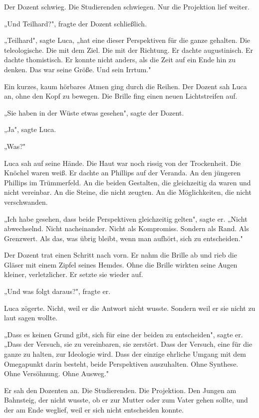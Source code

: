\documentclass[
  ngerman,
]{article}
\begin{document}
Der Dozent schwieg. Die Studierenden schwiegen. Nur die Projektion lief
weiter.

„Und Teilhard?", fragte der Dozent schließlich.

„Teilhard", sagte Luca, „hat eine dieser Perspektiven für die ganze
gehalten. Die teleologische. Die mit dem Ziel. Die mit der Richtung. Er
dachte augustinisch. Er dachte thomistisch. Er konnte nicht anders, als
die Zeit auf ein Ende hin zu denken. Das war seine Größe. Und sein
Irrtum."

Ein kurzes, kaum hörbares Atmen ging durch die Reihen. Der Dozent sah
Luca an, ohne den Kopf zu bewegen. Die Brille fing einen neuen
Lichtstreifen auf.

„Sie haben in der Wüste etwas gesehen", sagte der Dozent.

„Ja", sagte Luca.

„Was?"

Luca sah auf seine Hände. Die Haut war noch rissig von der Trockenheit.
Die Knöchel waren weiß. Er dachte an Phillips auf der Veranda. An den
jüngeren Phillips im Trümmerfeld. An die beiden Gestalten, die
gleichzeitig da waren und nicht vereinbar. An die Steine, die nicht
zeugten. An die Möglichkeiten, die nicht verschwanden.

„Ich habe gesehen, dass beide Perspektiven gleichzeitig gelten", sagte
er. „Nicht abwechselnd. Nicht nacheinander. Nicht als Kompromiss.
Sondern als Rand. Als Grenzwert. Als das, was übrig bleibt, wenn man
aufhört, sich zu entscheiden."

Der Dozent trat einen Schritt nach vorn. Er nahm die Brille ab und rieb
die Gläser mit einem Zipfel seines Hemdes. Ohne die Brille wirkten seine
Augen kleiner, verletzlicher. Er setzte sie wieder auf.

„Und was folgt daraus?", fragte er.

Luca zögerte. Nicht, weil er die Antwort nicht wusste. Sondern weil er
sie nicht zu laut sagen wollte.

„Dass es keinen Grund gibt, sich für eine der beiden zu entscheiden",
sagte er. „Dass der Versuch, sie zu vereinbaren, sie zerstört. Dass der
Versuch, eine für die ganze zu halten, zur Ideologie wird. Dass der
einzige ehrliche Umgang mit dem Omegapunkt darin besteht, beide
Perspektiven auszuhalten. Ohne Synthese. Ohne Versöhnung. Ohne Ausweg."

Er sah den Dozenten an. Die Studierenden. Die Projektion. Den Jungen am
Bahnsteig, der nicht wusste, ob er zur Mutter oder zum Vater gehen
sollte, und der am Ende weglief, weil er sich nicht entscheiden konnte.
\end{document}

